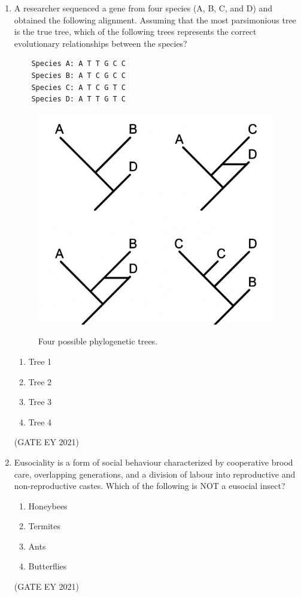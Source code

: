\documentclass[journal]{IEEEtran}
\begin{document}
\begin{enumerate}
    \item A researcher sequenced a gene from four species (A, B, C, and D) and obtained the following alignment. Assuming that the most parsimonious tree is the true tree, which of the following trees represents the correct evolutionary relationships between the species?
    \begin{verbatim}
    Species A: A T T G C C
    Species B: A T C G C C
    Species C: A T C G T C
    Species D: A T T G T C
    \end{verbatim}
    \begin{figure}[!h]
        \centering
        \includegraphics[width=0.7\columnwidth]{figs/Q.44.png}
        \label{Q.44}
        \caption{Four possible phylogenetic trees.}
    \end{figure}
    \begin{multicols}{4}
    \begin{enumerate}
        \item Tree 1
        \item Tree 2
        \item Tree 3
        \item Tree 4
    \end{enumerate}
    \end{multicols}
    \hfill{(GATE EY 2021)}

    \item Eusociality is a form of social behaviour characterized by cooperative brood care, overlapping generations, and a division of labour into reproductive and non-reproductive castes. Which of the following is NOT a eusocial insect?
    \begin{multicols}{4}
    \begin{enumerate}
        \item Honeybees
        \item Termites
        \item Ants
        \item Butterflies
    \end{enumerate}
    \end{multicols}
    \hfill{(GATE EY 2021)}


\end{enumerate}
\end{document}
